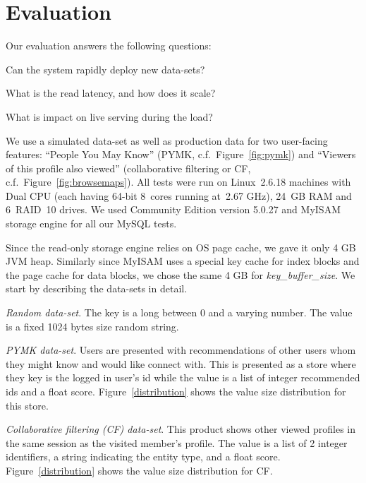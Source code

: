 \section{Evaluation}
\label{sec:evaluation}

Our evaluation answers the following questions:
\begin{compactenum}
\item Can the system rapidly deploy new data-sets?
\item What is the read latency, and how does it scale?
\item What is impact on live serving during the load?
\end{compactenum}

We use a simulated data-set as well as production data for two
user-facing features: ``People You May Know'' (PYMK,
c.f.~Figure~\ref{fig:pymk}) and ``Viewers of this profile also
viewed'' (collaborative filtering or CF,
c.f.~Figure~\ref{fig:browsemaps}). All tests were run on Linux~2.6.18
machines with Dual CPU (each having 64-bit 8~cores running at~2.67 GHz),
24~GB RAM and 6~RAID~10 drives. We used Community Edition
version 5.0.27 and MyISAM storage engine for all our MySQL tests.

Since the read-only storage engine relies on OS page cache, we gave 
it only 4 GB JVM heap. Similarly since MyISAM uses a special key cache
for index blocks and the page cache for data blocks, we chose the same
4 GB for \emph{key\_buffer\_size}. We start by describing the data-sets in detail.

\begin{compactitem}
\item \emph{Random data-set}. The key is a long between
0 and a varying number. The value is a fixed 1024 bytes size random
string. 
\item \emph{PYMK data-set}. Users are presented with recommendations
of other users whom they might know and would like connect with. This
is presented as a store where they key is the logged in user's id
while the value is a list of integer recommended ids and a float
score. Figure~\ref{distribution} shows the value size distribution for
this store. 
\item \emph{Collaborative filtering (CF) data-set}. This product shows
other viewed profiles in the same session as the visited member's
profile. The value is a list of 2 integer identifiers, a string
indicating the entity type, and a float score.
Figure~\ref{distribution} shows the value size distribution for CF. 
\end{compactitem}


